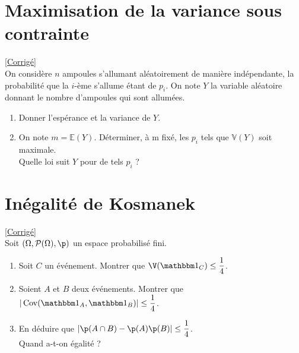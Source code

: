 \documentclass[8pt]{book}
\begin{document}
\section{Maximisation de la variance sous contrainte }
\label{Maximisation de la variance sous contrainte}
\textcolor{blue}{\hyperref[Maximisation de la variance sous contrainte corrigé]{[Corrigé]}}\\
On considère $n$ ampoules s'allumant aléatoirement de manière indépendante, la probabilité que la $i$-ème s'allume étant de $p_i$. On note $Y$ la variable aléatoire donnant le nombre d'ampoules qui sont allumées.
\begin{enumerate}
	\item Donner l'espérance et la variance de $Y$.
	\item On note $m=\mathbb{E}(Y)$. Déterminer, à m fixé, les $p_i$ tels que $\mathbb{V}(Y)$ soit maximale.
	\\ Quelle loi suit $Y$ pour de tels $p_i$ ?
\end{enumerate}

\section{Inégalité de Kosmanek }
\label{Inégalité de Kosmanek}
\textcolor{blue}{\hyperref[Inégalité de Kosmanek corrigé]{[Corrigé]}}\\
Soit $(\Omega,\mathcal P(\Omega),\p)$ un espace probabilisé fini.
\begin{enumerate}
	\item Soit $C$ un événement. Montrer que $\displaystyle\V(\mathbbm 1_C)\leq \frac{1}{4}$.
	\item Soient $A$ et $B$ deux événements. Montrer que $\displaystyle|\operatorname{Cov}(\mathbbm 1_A,\mathbbm 1_B)|\leq \frac{1}{4}$.
	\item En déduire que $|\p(A\cap B)-\p(A)\p(B)|\leq\displaystyle\frac{1}{4}$.
	\\Quand a-t-on égalité ?
\end{enumerate}
\end{document}
